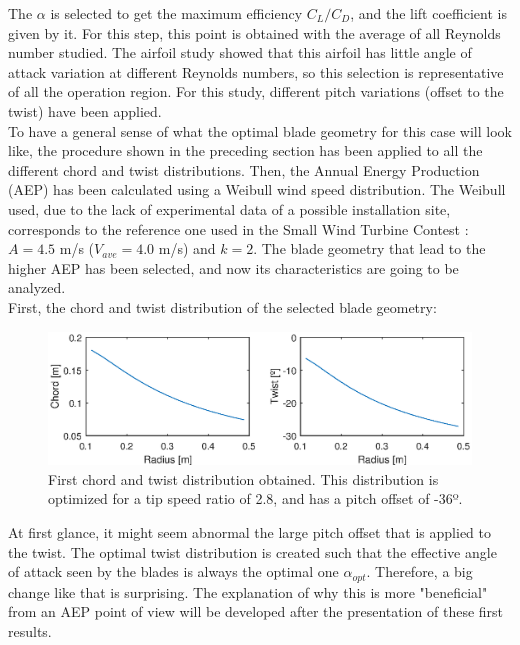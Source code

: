 \documentclass[../TFG_Report.tex]{subfiles}
\begin{document}
The $\alpha$ is selected to get the maximum efficiency $C_L/C_D$, and the lift coefficient is given by it. For this step, this point is obtained with the average of all Reynolds number studied. The airfoil study showed that this airfoil has little angle of attack variation at different Reynolds numbers, so this selection is representative of all the operation region. For this study, different pitch variations (offset to the twist) have been applied. \\


To have a general sense of what the optimal blade geometry for this case will look like, the procedure shown in the preceding section has been applied to all the different chord and twist distributions. Then, the Annual Energy Production (AEP) has been calculated using a Weibull wind speed distribution. The Weibull used, due to the lack of experimental data of a possible installation site, corresponds to the reference one used in the Small Wind Turbine Contest \cite{SWTContest}: $A=4.5$ m/s ($V_{ave}=4.0$ m/s) and $k=2$. The blade geometry that lead to the higher AEP has been selected, and now its characteristics are going to be analyzed. \\

First, the chord and twist distribution of the selected blade geometry: 

\begin{figure}[h!]
	\centering
	\includegraphics[width=1\linewidth]{Images/Aerodynamic_Design/Chord_Twist_first}
	\caption[First chord and twist distribution obtained]{First chord and twist distribution obtained. This distribution is optimized for a tip speed ratio of 2.8, and has a pitch offset of -36º.}
	\label{fig:ChordTwistFirst}
\end{figure}

At first glance, it might seem abnormal the large pitch offset that is applied to the twist. The optimal twist distribution is created such that the effective angle of attack seen by the blades is always the optimal one $\alpha_{opt}$. Therefore, a big change like that is surprising. The explanation of why this is more "beneficial" from an AEP point of view will be developed after the presentation of these first results. \\
\end{document}
